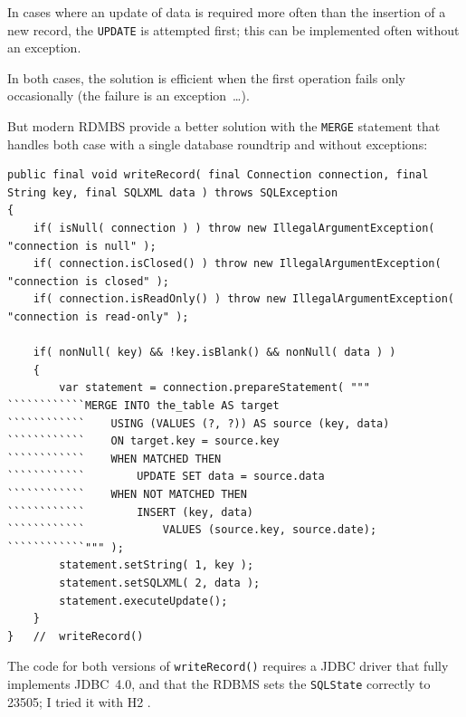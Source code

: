 In cases where an update of data is required more often than the insertion of a new record, the \texttt{UPDATE} is attempted first; this can be implemented often without an exception.

In both cases, the solution is efficient when the first operation fails only occasionally (the failure is an exception~…).

But modern RDMBS provide a better solution with the \texttt{MERGE} statement that handles both case with a single database roundtrip and without exceptions:
\begin{lstlisting}
public final void writeRecord( final Connection connection, final String key, final SQLXML data ) throws SQLException
{
    if( isNull( connection ) ) throw new IllegalArgumentException( "connection is null" );
    if( connection.isClosed() ) throw new IllegalArgumentException( "connection is closed" );
    if( connection.isReadOnly() ) throw new IllegalArgumentException( "connection is read-only" );

    if( nonNull( key) && !key.isBlank() && nonNull( data ) )
    {
        var statement = connection.prepareStatement( """
````````````MERGE INTO the_table AS target
````````````    USING (VALUES (?, ?)) AS source (key, data)
````````````    ON target.key = source.key
````````````    WHEN MATCHED THEN
````````````        UPDATE SET data = source.data
````````````    WHEN NOT MATCHED THEN 
````````````        INSERT (key, data) 
````````````            VALUES (source.key, source.date);
````````````""" );
        statement.setString( 1, key );
        statement.setSQLXML( 2, data );
        statement.executeUpdate();
    }
}   //  writeRecord()
\end{lstlisting}

The code for both versions of \lstinline|writeRecord()| requires a JDBC driver that fully implements JDBC~4.0, and that the RDBMS sets the \texttt{SQLState} correctly to 23505; I tried it with H2 \autocite{H2_DATABASE}.

